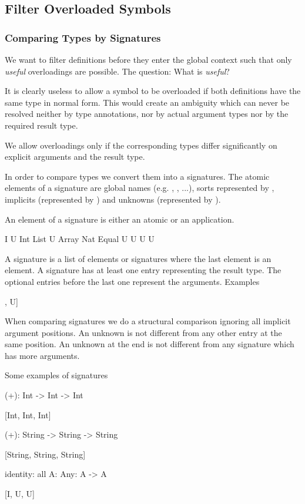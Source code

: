 \subsection{Filter Overloaded Symbols}


\subsubsection{Comparing Types by Signatures}

We want to filter definitions before they enter the global context such that
only \emph{useful} overloadings are possible. The question: What is
\emph{useful}?

It is clearly useless to allow a symbol to be overloaded if both definitions
have the same type in normal form. This would create an ambiguity which can
never be resolved neither by type annotations, nor by actual argument types nor
by the required result type.

We allow overloadings only if the corresponding types differ significantly on
explicit arguments and the result type.

In order to compare types we convert them into a signatures. The atomic elements
of a signature are global names (e.g. , , ...), sorts
represented by , implicits
(represented by ) and unknowns (represented by ).

An element of a signature is either an atomic or an application.
\begin{alba}
    I
    U
    Int
    List U
    Array Nat
    Equal U U
    U U
\end{alba}

A signature is a list of elements or signatures where the last element is an
element. A signature has at least one entry representing the result type. The
optional entries before the last one represent the arguments. Examples
\begin{alba}
    [Int, Int, Int]
    [Float, Float, Float]
    [I, U, U, U]
    [I, U, List U, List U]
    [I, I, U, [U, U], U]
\end{alba}

When comparing signatures we do a structural comparison ignoring all implicit
argument positions. An unknown is not different from any other entry at the same
position. An unknown at the end is not different from any signature which has
more arguments.

Some examples of signatures
\begin{alba}
    (+): Int -> Int -> Int

        [Int, Int, Int]


    (+): String -> String -> String

        [String, String, String]


    identity: all {A: Any}: A -> A

        [I, U, U]
\end{alba}

